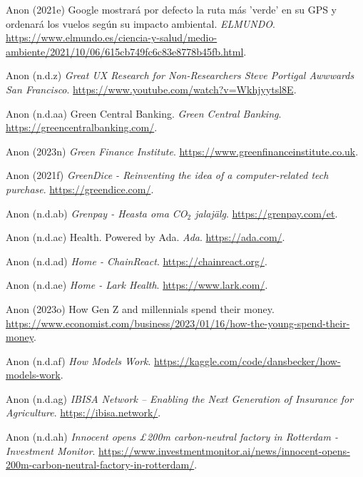 \documentclass[
  letterpaper,
  DIV=11,
  numbers=noendperiod]{scrartcl}
\newlength{\cslhangindent}
\newenvironment{CSLReferences}[2] %
 {\begin{list}{}{%
  \setlength{\itemindent}{0pt}
  \setlength{\leftmargin}{0pt}
  \setlength{\parsep}{0pt}
  \ifodd #1
   \setlength{\leftmargin}{\cslhangindent}
   \setlength{\itemindent}{-1\cslhangindent}
  \fi
  \setlength{\itemsep}{#2\baselineskip}}}
 {\end{list}}
\begin{document}
\begin{CSLReferences}{0}{1}
Anon (2021e) {Google mostrar{á} por defecto la ruta m{á}s 'verde' en su
GPS y ordenar{á} los vuelos seg{ú}n su impacto ambiental}.
\emph{ELMUNDO}.
\url{https://www.elmundo.es/ciencia-y-salud/medio-ambiente/2021/10/06/615cb749fc6c83e8778b45fb.html}.

Anon (n.d.z) \emph{Great {UX Research} for {Non-Researchers} {\textbar}
{Steve Portigal} {\textbar} {Awwwards San Francisco}}.
\url{https://www.youtube.com/watch?v=Wkhjyytsl8E}.

Anon (n.d.aa) Green {Central Banking}. \emph{Green Central Banking}.
\url{https://greencentralbanking.com/}.

Anon (2023n) \emph{Green {Finance Institute}}.
\url{https://www.greenfinanceinstitute.co.uk}.

Anon (2021f) \emph{{GreenDice} - {Reinventing} the idea of a
computer-related tech purchase}. \url{https://greendice.com/}.

Anon (n.d.ab) \emph{Grenpay - {Heasta} oma {CO}{\(_2\)} jalaj{ä}lg}.
\url{https://grenpay.com/et}.

Anon (n.d.ac) Health. {Powered} by {Ada}. \emph{Ada}.
\url{https://ada.com/}.

Anon (n.d.ad) \emph{Home - {ChainReact}}. \url{https://chainreact.org/}.

Anon (n.d.ae) \emph{Home - {Lark Health}}. \url{https://www.lark.com/}.

Anon (2023o) How {Gen Z} and millennials spend their money.
\url{https://www.economist.com/business/2023/01/16/how-the-young-spend-their-money}.

Anon (n.d.af) \emph{How {Models Work}}.
\url{https://kaggle.com/code/dansbecker/how-models-work}.

Anon (n.d.ag) \emph{{IBISA Network} -- {Enabling} the {Next Generation}
of {Insurance} for {Agriculture}}. \url{https://ibisa.network/}.

Anon (n.d.ah) \emph{Innocent opens {£}200m carbon-neutral factory in
{Rotterdam} - {Investment Monitor}}.
\url{https://www.investmentmonitor.ai/news/innocent-opens-200m-carbon-neutral-factory-in-rotterdam/}.


\end{CSLReferences}
\end{document}
